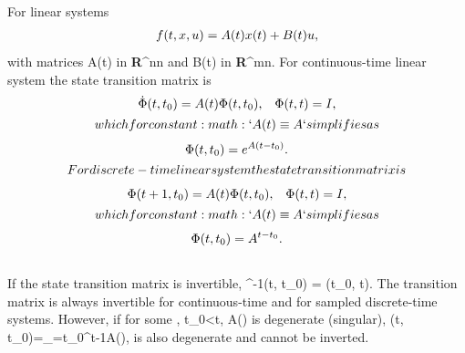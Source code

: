 \documentclass[letterpaper,10pt,english]{sphinxmanual}
\begin{document}
For linear systems
\begin{gather}
\begin{split}f(t, x, u) = A(t)x(t) + B(t)u,
\label{linearrhs}\end{split}\notag
\end{gather}
with matrices A(t) in {\bf R}^{n\times n} and
B(t) in {\bf R}^{m\times n}. For continuous-time linear
system the state transition matrix is
\begin{gather}
\begin{split}\dot{\Phi}(t, t_0) = A(t)\Phi(t, t_0), \;\;\; \Phi(t, t) = I,\end{split}\notag\\\begin{split}which for constant :math:`A(t)\equiv A` simplifies as\end{split}\notag
\end{gather}\begin{gather}
\begin{split}\Phi(t, t_0) = e^{A(t-t_0)} .\end{split}\notag\\\begin{split}For discrete-time linear system the state transition matrix is\end{split}\notag
\end{gather}\begin{gather}
\begin{split}\Phi(t+1, t_0) = A(t)\Phi(t, t_0), \;\;\; \Phi(t, t) = I,\end{split}\notag\\\begin{split}which for constant :math:`A(t)\equiv A` simplifies as\end{split}\notag
\end{gather}\begin{gather}
\begin{split}\Phi(t, t_0) = A^{t-t_0} .\end{split}\notag\\\begin{split}\end{split}\notag
\end{gather}
If the state transition matrix is invertible,
\Phi^{-1}(t, t_0) = \Phi(t_0, t). The transition matrix is
always invertible for continuous-time and for sampled discrete-time
systems. However, if for some \tau, t_0\leqslant\tau<t,
A(\tau) is degenerate (singular),
\Phi(t, t_0)=\prod_{\tau=t_0}^{t-1}A(\tau), is also degenerate
and cannot be inverted.
\end{document}
